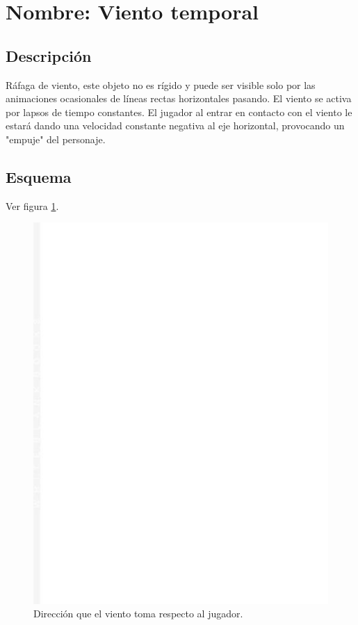 		\section{Nombre: Viento temporal}\label{obs.vientoT}
	\subsection{Descripción}
	Ráfaga de viento, este objeto no es rígido y puede ser visible solo por las animaciones ocasionales de líneas rectas horizontales pasando. El viento se activa por lapsos de tiempo constantes. El jugador al entrar en contacto con el viento le estará dando una velocidad constante negativa al eje horizontal, provocando un "empuje" del personaje. 
	\subsection{Esquema}
	Ver figura \ref{fig:vientoT}.
	\begin{figure}
		\centering
		\includegraphics[height=0.2 \textheight]{Imagenes/vientoT}
		\caption{Dirección que el viento toma respecto al jugador.}
		\label{fig:vientoT}
	\end{figure}